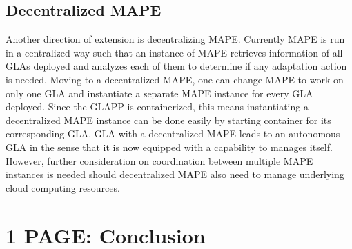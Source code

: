 \documentclass{seal_thesis}
\begin{document}
\section{Decentralized MAPE}
Another direction of extension is decentralizing MAPE.
Currently MAPE is run in a centralized way such that an instance of MAPE retrieves information of all GLAs deployed and analyzes each of them to determine if any adaptation action is needed.
Moving to a decentralized MAPE, one can change MAPE to work on only one GLA and instantiate a separate MAPE instance for every GLA deployed.
Since the GLAPP is containerized, this means instantiating a decentralized MAPE instance can be done easily by starting container for its corresponding GLA.
GLA with a decentralized MAPE leads to an autonomous GLA in the sense that it is now equipped with a capability to manages itself.
However, further consideration on coordination between multiple MAPE instances is needed should decentralized MAPE also need to manage underlying cloud computing resources.

\chapter{1 PAGE: Conclusion}\label{ch:conclusion}





\end{document}
